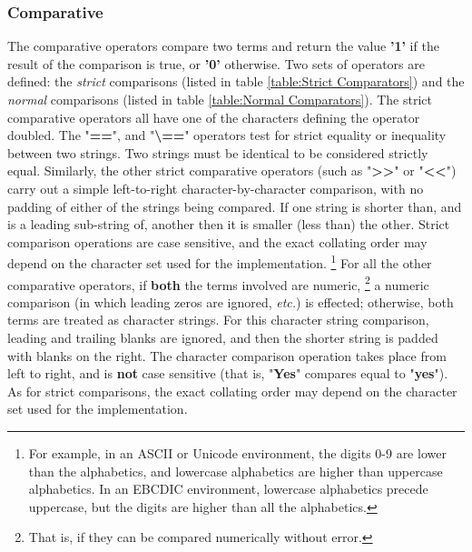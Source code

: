 \subsubsection{Comparative}\label{refcomps}
The comparative operators compare two terms and return the
value \textbf{'1'} if the result of the comparison is true,
or \textbf{'0'} otherwise.  Two sets of operators are defined: the
\emph{strict} comparisons (listed in table \ref{table:Strict
  Comparators}) and the \emph{normal} comparisons (listed in table
\ref{table:Normal Comparators}).
 The strict comparative operators all have one of the characters
defining the operator doubled.  The "\textbf{==}",
and "\textbf{\textbackslash ==}" operators
test for strict equality or inequality between two strings.
Two strings must be identical to be considered strictly equal.
Similarly, the other strict comparative operators (such as
"\textbf{>{}>}" or "\textbf{<{}<}") carry out a simple
left-to-right character-by-character comparison, with no padding of
either of the strings being compared.
If one string is shorter than, and is a leading sub-string of, another
then it is smaller (less than) the other.
Strict comparison operations are case sensitive, and the exact collating
order may depend on the character set used for the implementation.
\footnote{
For example, in an ASCII or Unicode environment, the digits 0-9
are lower than the alphabetics, and lowercase alphabetics are higher
than uppercase alphabetics.
In an EBCDIC environment, lowercase alphabetics precede uppercase, but
the digits are higher than all the alphabetics.
}
 For all the other comparative operators, if \textbf{both} the
terms involved are numeric,
\footnote{
That is, if they can be compared numerically without error.
}
a numeric comparison (in which leading zeros are ignored,
\emph{etc.}) is effected; otherwise, both terms are treated as character
strings.
For this character string comparison, leading and trailing blanks are
ignored, and then the shorter string is padded with blanks on the right.
The character comparison operation takes place from left to right, and
is \textbf{not} case sensitive (that is, "\textbf{Yes}"
compares equal to "\textbf{yes}").
As for strict comparisons, the exact collating order may depend on the
character set used for the implementation.

